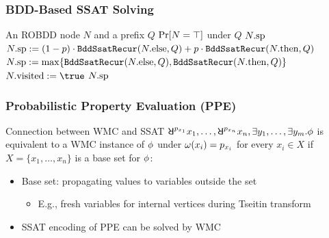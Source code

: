 \begin{frame}
  \frametitle{BDD-Based SSAT Solving}
  {
    \small
    \begin{algorithmic}[1]
      \REQUIRE An ROBDD node $N$ and a prefix $Q$
      \ENSURE $\Pr[N=\top]$ under $Q$
      \label{code:bddssat-recursive-constant-start}
      \RETURN $N.\mathrm{sp}$\label{code:bddssat-recursive-constant-end}
      \ENDIF
      \alert{\STATE $N.\mathrm{sp}:=(1-p)\cdot\texttt{BddSsatRecur}(N.\mathrm{else},Q)+p\cdot\texttt{BddSsatRecur}(N.\mathrm{then},Q)$}
      \label{code:bddssat-recursive-random}
      \ELSE
      \alert{\STATE $N.\mathrm{sp}:=\max\{\texttt{BddSsatRecur}(N.\mathrm{else},Q),\texttt{BddSsatRecur}(N.\mathrm{then},Q)\}$}
      \label{code:bddssat-recursive-exist}
      \ENDIF
      \STATE $\nodevisit{N} := \true$
      \ENDIF
      \RETURN $N.\mathrm{sp}$
    \end{algorithmic}
  }
\end{frame}

\begin{frame}
  \frametitle{Probabilistic Property Evaluation (PPE)}
  \begin{block}{Connection between WMC and SSAT}
    $\random{p_{x_1}}x_1,\ldots,\random{p_{x_n}}x_n,\exists y_1,\ldots,\exists y_m.\pf$ is equivalent to a WMC instance of $\phi$ under $\omega(x_i)=p_{x_i}$ for every $x_i\in X$ if $X=\{x_1,\ldots,x_n\}$ is a \alert{base set} for $\phi$:
    \pause
    \begin{itemize}
      \item Base set: propagating values to variables outside the set
            \pause
            \begin{itemize}
              \item E.g., fresh variables for internal vertices during Tseitin transform
                    \pause
            \end{itemize}
      \item SSAT encoding of PPE can be solved by WMC
    \end{itemize}
  \end{block}
\end{frame}

